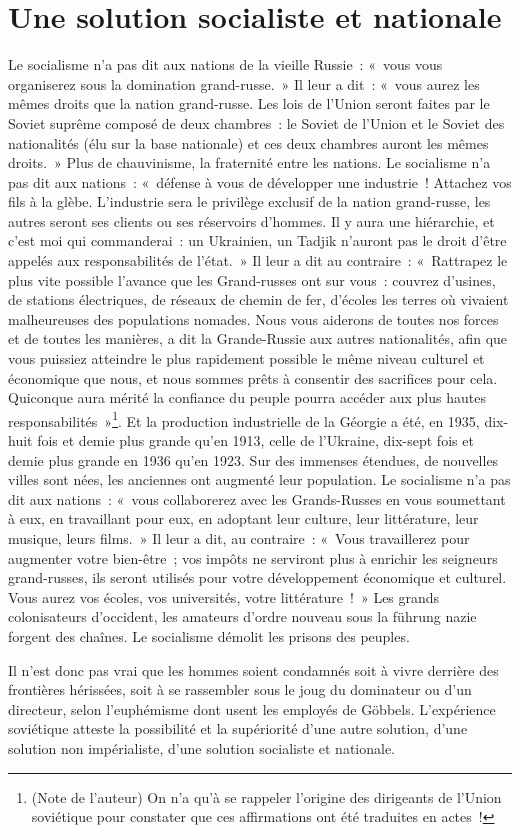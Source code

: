 \documentclass[french,twoside]{book} %
\begin{document}
\section[Une solution socialiste et nationale]{Une solution socialiste et nationale}
\noindent Le socialisme n’a pas dit aux nations de la vieille Russie : « vous vous organiserez sous la domination grand-russe. » Il leur a dit : « vous aurez les mêmes droits que la nation grand-russe. Les lois de l’Union seront faites par le Soviet suprême composé de deux chambres : le Soviet de l’Union et le Soviet des nationalités (élu sur la base nationale) et ces deux chambres auront les mêmes droits. » Plus de chauvinisme, la fraternité entre les nations. Le socialisme n’a pas dit aux nations : « défense à vous de développer une industrie ! Attachez vos fils à la glèbe. L’industrie sera le privilège exclusif de la nation grand-russe, les autres seront ses clients ou ses réservoirs d’hommes. Il y aura une hiérarchie, et c’est moi qui commanderai : un Ukrainien, un Tadjik n’auront pas le droit d’être appelés aux responsabilités de l’état. » Il leur a dit au contraire : « Rattrapez le plus vite possible l’avance que les Grand-russes ont sur vous : couvrez d’usines, de stations électriques, de réseaux de chemin de fer, d’écoles les terres où vivaient malheureuses des populations nomades. Nous vous aiderons de toutes nos forces et de toutes les manières, a dit la Grande-Russie aux autres nationalités, afin que vous puissiez atteindre le plus rapidement possible le même niveau culturel et économique que nous, et nous sommes prêts à consentir des sacrifices pour cela. Quiconque aura mérité la confiance du peuple pourra accéder aux plus hautes responsabilités »\footnote{(Note de l’auteur) On n’a qu’à se rappeler l’origine des dirigeants de l’Union soviétique pour constater que ces affirmations ont été traduites en actes !}. Et la production industrielle de la Géorgie a été, en 1935, dix-huit fois et demie plus grande qu’en 1913, celle de l’Ukraine, dix-sept fois et demie plus grande en 1936 qu’en 1923. Sur des immenses étendues, de nouvelles villes sont nées, les anciennes ont augmenté leur population. Le socialisme n’a pas dit aux nations : « vous collaborerez avec les Grands-Russes en vous soumettant à eux, en travaillant pour eux, en adoptant leur culture, leur littérature, leur musique, leurs films. » Il leur a dit, au contraire : « Vous travaillerez pour augmenter votre bien-être ; vos impôts ne serviront plus à enrichir les seigneurs grand-russes, ils seront utilisés pour votre développement économique et culturel. Vous aurez vos écoles, vos universités, votre littérature ! » Les grands colonisateurs d’occident, les amateurs d’ordre nouveau sous la führung nazie forgent des chaînes. Le socialisme démolit les prisons des peuples.\par
Il n’est donc pas vrai que les hommes soient condamnés soit à vivre derrière des frontières hérissées, soit à se rassembler sous le joug du dominateur ou d’un directeur, selon l’euphémisme dont usent les employés de Göbbels. L’expérience soviétique atteste la possibilité et la supériorité d’une autre solution, d’une solution non impérialiste, d’une solution socialiste et nationale.
\end{document}
